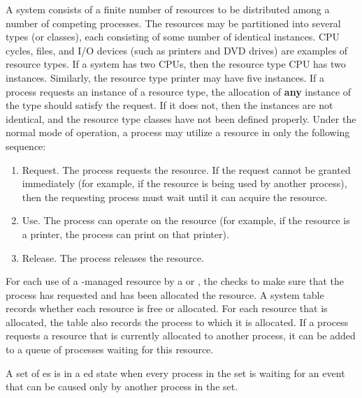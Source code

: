 A system consists of a finite number of resources to be distributed among a number of competing processes.
The resources may be partitioned into several types (or classes), each consisting of some number of identical instances.
CPU cycles, files, and I/O devices (such as printers and DVD drives) are examples of resource types.
If a system has two CPUs, then the resource type CPU has two instances.
Similarly, the resource type printer may have five instances.
If a process requests an instance of a resource type, the allocation of \textbf{any} instance of the type should satisfy the request.
If it does not, then the instances are not identical, and the resource type classes have not been defined properly.
Under the normal mode of operation, a process may utilize a resource in only the following sequence:
\begin{enumerate}[noitemsep]
\item Request.
  The process requests the resource.
  If the request cannot be granted immediately (for example, if the resource is being used by another process), then the requesting process must wait until it can acquire the resource.
\item Use.
  The process can operate on the resource (for example, if the resource is a printer, the process can print on that printer).
\item Release.
  The process releases the resource.
\end{enumerate}

For each use of a -managed resource by a  or , the  checks to make sure that the process has requested and has been allocated the resource.
A system table records whether each resource is free or allocated.
For each resource that is allocated, the table also records the process to which it is allocated.
If a process requests a resource that is currently allocated to another process, it can be added to a queue of processes waiting for this resource.
\begin{blackbox}
  A set of es is in a ed state when every process in the set is waiting for an event that can be caused only by another process in the set.
\end{blackbox}

